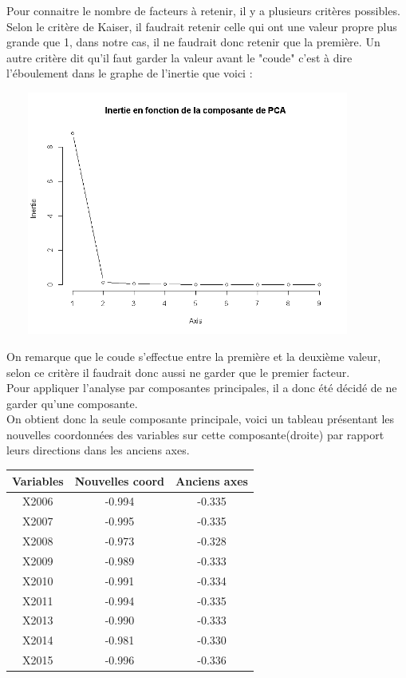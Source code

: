 \documentclass{article}
\begin{document}
Pour connaitre le nombre de facteurs à retenir, il y a plusieurs critères possibles.  
Selon le critère de Kaiser, il faudrait retenir celle qui ont une valeur propre plus grande que 1, dans notre cas, il ne faudrait donc retenir que la première.
Un autre critère dit qu'il faut garder la valeur avant le "coude" c'est à dire l'éboulement dans le graphe de l'inertie que voici : 
 
  \includegraphics[width=12cm,height=8cm]{"screeplot"}
 
 
On remarque que le coude s'effectue entre la première et la deuxième valeur, selon ce critère il faudrait donc aussi ne garder que le premier facteur.
\\Pour appliquer l'analyse par composantes principales, il a donc été décidé de ne garder qu'une composante.
\\On obtient donc la seule composante principale, voici un tableau présentant les nouvelles coordonnées des variables sur cette composante(droite) par rapport leurs directions dans les anciens axes.
\begin{table}[h]
\centering 
\begin{tabular}{|c|c|c|} 
  \hline
  Variables & Nouvelles coord & Anciens axes\\
  \hline
  X2006 & -0.994 & -0.335\\
  \hline
  X2007 & -0.995 & -0.335\\
  \hline
  X2008 & -0.973 & -0.328\\
  \hline
  X2009 & -0.989 & -0.333\\
  \hline
  X2010 & -0.991 & -0.334\\
  \hline
  X2011 & -0.994 & -0.335\\
  \hline
  X2013 & -0.990 & -0.333\\
  \hline
  X2014 & -0.981 & -0.330\\
  \hline
  X2015 & -0.996 & -0.336\\
  \hline
\end{tabular}
\end{table}
\end{document}
